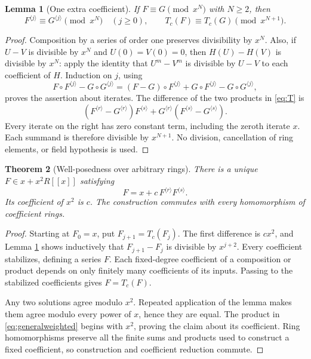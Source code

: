\documentclass[11pt,letterpaper]{article}
\newtheorem{theorem}{Theorem}[section]
\newtheorem{lemma}[theorem]{Lemma}
\theoremstyle{definition}
\theoremstyle{remark}
\newcommand{\iter}[2]{#1^{\langle #2\rangle}}
\begin{document}
\begin{lemma}[One extra coefficient]\label{lem:contraction}
If $F\equiv G\pmod {x^N}$ with $N\geq2$, then
\[
 \iter{F}{j}\equiv\iter{G}{j}\pmod {x^N}\quad(j\geq0),
 \qquad T_c(F)\equiv T_c(G)\pmod {x^{N+1}}.
\]
\end{lemma}
\begin{proof}
Composition by a series of order one preserves divisibility by $x^N$.
Also, if $U-V$ is divisible by $x^N$ and $U(0)=V(0)=0$, then
$H(U)-H(V)$ is divisible by $x^N$: apply the identity that
$U^m-V^m$ is divisible by $U-V$ to each coefficient of $H$.
Induction on $j$, using
\[
 F\circ\iter{F}{j}-G\circ\iter{G}{j}
 =(F-G)\circ\iter{F}{j}
   +G\circ\iter{F}{j}-G\circ\iter{G}{j},
\]
proves the assertion about iterates.  The difference of the two products
in \eqref{eq:T} is
\[
 (\iter{F}{r}-\iter{G}{r})\iter{F}{s}
 +\iter{G}{r}(\iter{F}{s}-\iter{G}{s}).
\]
Every iterate on the right has zero constant term, including the
zeroth iterate $x$.  Each summand is therefore divisible by $x^{N+1}$.
No division, cancellation of ring elements, or field hypothesis is used.
\end{proof}

\begin{theorem}[Well-posedness over arbitrary rings]\label{thm:unique}
There is a unique $F\in x+x^2R[[x]]$ satisfying
\begin{equation}\label{eq:generalweighted}
 F=x+c\,\iter{F}{r}\iter{F}{s}.
\end{equation}
Its coefficient of $x^2$ is $c$.  The construction commutes with every
homomorphism of coefficient rings.
\end{theorem}
\begin{proof}
Starting at $F_0=x$, put $F_{j+1}=T_c(F_j)$.  The first difference is
$c x^2$, and Lemma \ref{lem:contraction} shows inductively that
$F_{j+1}-F_j$ is divisible by $x^{j+2}$.  Every coefficient stabilizes,
defining a series $F$.  Each fixed-degree coefficient of a composition
or product depends on only finitely many coefficients of its inputs.
Passing to the stabilized coefficients gives $F=T_c(F)$.

Any two solutions agree modulo $x^2$.  Repeated application of the lemma
makes them agree modulo every power of $x$, hence they are equal.
The product in \eqref{eq:generalweighted} begins with $x^2$, proving the
claim about its coefficient.  Ring homomorphisms preserve all the
finite sums and products used to construct a fixed coefficient, so
construction and coefficient reduction commute.
\end{proof}
\end{document}
